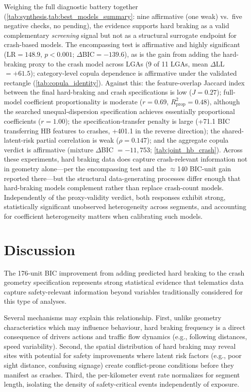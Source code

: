 \documentclass[letterpaper,8pt]{extarticle}  %
\begin{document}
\begin{doublespacing}
\begin{linenumbers}
Weighing the full diagnostic battery together (\cref{tab:synthesis,tab:best_models_summary}: nine affirmative (one weak) vs.~five negative checks, no pending), the evidence supports hard braking as a valid complementary \emph{screening} signal but not as a structural surrogate endpoint for crash-based models. The encompassing test is affirmative and highly significant (LR$=148.9$, $p<0.001$; $\Delta$BIC$=-139.6$), as is the gain from adding the hard-braking proxy to the crash model across LGAs (9 of 11 LGAs, mean $\Delta$LL $=+61.5$); category-level copula dependence is affirmative under the validated rectangle (\cref{tab:copula_identity}). Against this: the feature-overlap Jaccard index between the final hard-braking and crash specifications is low ($J=0.27$); full-model coefficient proportionality is moderate ($r=0.69$, $R^2_{\text{prop}}=0.48$), although the searched unequal-dispersion specification achieves essentially proportional coefficients ($r=1.00$); the specification-transfer penalty is large (+71.1 BIC transferring HB features to crashes, +401.1 in the reverse direction); the shared-latent-risk partial correlation is weak ($\rho=0.147$); and the aggregate copula verdict is affirmative (mixture $\Delta$BIC $=-11{,}753$; \cref{tab:joint_hb_crash}). Across these experiments, hard braking data does capture crash-relevant information not in geometry alone---per the encompassing test and the $\approx$140 BIC-unit gain reported there---but the structural data-generating processes differ enough that hard-braking models complement rather than replace crash-count models. Independently of the proxy-validity verdict, both responses exhibit strong, statistically significant unobserved heterogeneity across segments, and accounting for coefficient heterogeneity matters when calibrating such models.

\section{Discussion}\label{sec:discussion}

The 176-unit BIC improvement from adding predicted hard braking to the crash geometry specification represents strong statistical evidence that telematics data capture safety-relevant information beyond  variables traditionally considered for this type of analyses.

Several mechanisms may explain this relationship. First, unlike geometry characteristics which may influence behaviour, hard braking frequency is a direct consequence of drivers actions and traffic flow dynamics (e.g., following distances, speed variability). Second, the spatial distribution of hard braking may reveal sites with potential for safety improvements where latent risk factors (e.g., poor sight distance, confusing signage) create conflict-prone conditions before they manifest as crashes. Third, the per-kilometer event rate normalizes for segment length, isolating the density of safety-critical events independently of exposure.


\end{linenumbers}
\end{doublespacing}
\end{document}
